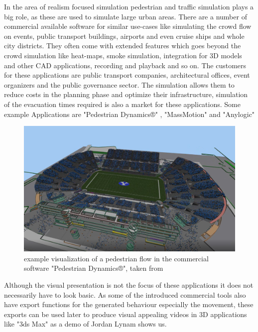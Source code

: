 \documentclass{acmsiggraph}               %
\begin{document}
In the area of realism focused simulation pedestrian and traffic simulation plays a big role, as these are used to simulate large urban areas. There are a number of commercial available software for similar use-cases like simulating the crowd flow on events, public transport buildings, airports and even cruise ships and whole city districts. They often come with extended features which goes beyond the crowd simulation like heat-maps, smoke simulation, integration for 3D models and other CAD applications, recording and playback and so on. The customers for these applications are public transport companies, architectural offices, event organizers and the public governance sector. The simulation allows them to reduce costs in the planning phase and optimize their infrastructure, simulation of the evacuation times required is also a market for these applications.  Some example Applications are "Pedestrian Dynamics®" \cite{pedestrian_dynamics_pedestrian_2020}, "MassMotion"  \cite{mediaworks_pedestrian_2020} and "Anylogic" \cite{anylogic_website}

\begin{figure}[h]
  \centering
  \includegraphics[width=1\linewidth]{images/PedestrianDynamicsStadionExample.png}
  \caption{example visualization of a pedestrian flow in the commercial software "Pedestrian Dynamics®",  taken from \protect\cite{pedestrian_dynamics_pedestrian_2020}}
  \label{fig:stadionEvacuationExample}
\end{figure}

Although the visual presentation is not the focus of these applications it does not necessarily have to look basic. As some of the introduced commercial tools also have export functions for the generated behaviour especially the movement, these exports can be used later to produce visual appealing videos in 3D applications like "3ds Max" as a demo of Jordan Lynam shows us. \cite{lynamJordan_viissim_3ds_max}
\end{document}

